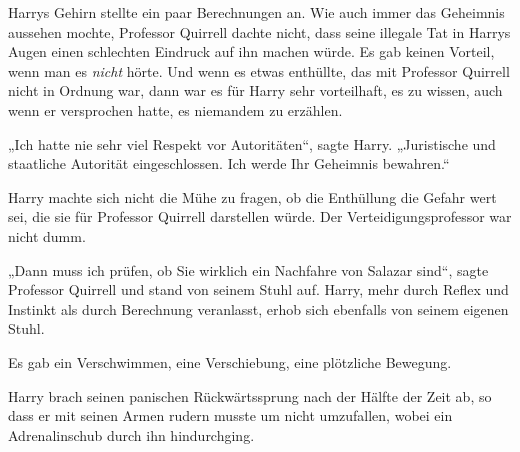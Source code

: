 Harrys Gehirn stellte ein paar Berechnungen an. Wie auch immer das Geheimnis aussehen mochte, Professor Quirrell dachte nicht, dass seine illegale Tat in Harrys Augen einen schlechten Eindruck auf ihn machen würde. Es gab keinen Vorteil, wenn man es \emph{nicht} hörte. Und wenn es etwas enthüllte, das mit Professor Quirrell nicht in Ordnung war, dann war es für Harry sehr vorteilhaft, es zu wissen, auch wenn er versprochen hatte, es niemandem zu erzählen.

„Ich hatte nie sehr viel Respekt vor Autoritäten“, sagte Harry. „Juristische und staatliche Autorität eingeschlossen. Ich werde Ihr Geheimnis bewahren.“

Harry machte sich nicht die Mühe zu fragen, ob die Enthüllung die Gefahr wert sei, die sie für Professor Quirrell darstellen würde. Der Verteidigungsprofessor war nicht dumm.

„Dann muss ich prüfen, ob Sie wirklich ein Nachfahre von Salazar sind“, sagte Professor Quirrell und stand von seinem Stuhl auf. Harry, mehr durch Reflex und Instinkt als durch Berechnung veranlasst, erhob sich ebenfalls von seinem eigenen Stuhl.

Es gab ein Verschwimmen, eine Verschiebung, eine plötzliche Bewegung.

Harry brach seinen panischen Rückwärtssprung nach der Hälfte der Zeit ab, so dass er mit seinen Armen rudern musste um nicht umzufallen, wobei ein Adrenalinschub durch ihn hindurchging.


